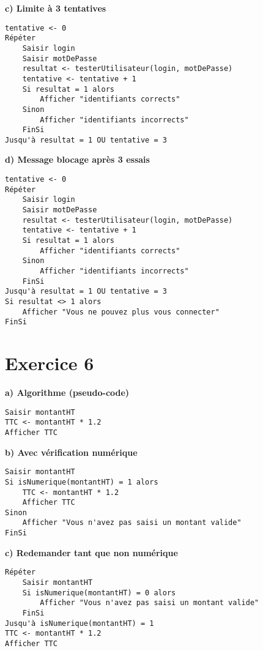 \documentclass[12pt,a4paper]{article}
\begin{document}
\textbf{c) Limite à 3 tentatives}
\begin{verbatim}
tentative <- 0
Répéter
    Saisir login
    Saisir motDePasse
    resultat <- testerUtilisateur(login, motDePasse)
    tentative <- tentative + 1
    Si resultat = 1 alors
        Afficher "identifiants corrects"
    Sinon
        Afficher "identifiants incorrects"
    FinSi
Jusqu'à resultat = 1 OU tentative = 3
\end{verbatim}

\textbf{d) Message blocage après 3 essais}
\begin{verbatim}
tentative <- 0
Répéter
    Saisir login
    Saisir motDePasse
    resultat <- testerUtilisateur(login, motDePasse)
    tentative <- tentative + 1
    Si resultat = 1 alors
        Afficher "identifiants corrects"
    Sinon
        Afficher "identifiants incorrects"
    FinSi
Jusqu'à resultat = 1 OU tentative = 3
Si resultat <> 1 alors
    Afficher "Vous ne pouvez plus vous connecter"
FinSi
\end{verbatim}

\section*{Exercice 6}
\textbf{a) Algorithme (pseudo-code)}
\begin{verbatim}
Saisir montantHT
TTC <- montantHT * 1.2
Afficher TTC
\end{verbatim}

\textbf{b) Avec vérification numérique}
\begin{verbatim}
Saisir montantHT
Si isNumerique(montantHT) = 1 alors
    TTC <- montantHT * 1.2
    Afficher TTC
Sinon
    Afficher "Vous n'avez pas saisi un montant valide"
FinSi
\end{verbatim}

\textbf{c) Redemander tant que non numérique}
\begin{verbatim}
Répéter
    Saisir montantHT
    Si isNumerique(montantHT) = 0 alors
        Afficher "Vous n'avez pas saisi un montant valide"
    FinSi
Jusqu'à isNumerique(montantHT) = 1
TTC <- montantHT * 1.2
Afficher TTC
\end{verbatim}
\end{document}
